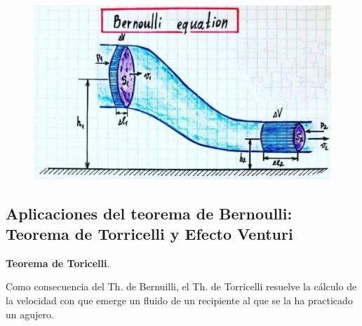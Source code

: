 \begin{figure}[H]
	\centering
	\includegraphics[width=1\textwidth]{imagenes/imagenes18/T18IM07.png}
	\end{figure}	

\subsection{Aplicaciones del teorema de Bernoulli: Teorema de Torricelli y Efecto Venturi}

\vspace{10mm} %

\textbf{\large{Teorema de Toricelli}}\normalsize{.}

\begin{miparrafodestacado}
	Como consecuencia del Th. de Bernuilli, el Th. de Torricelli resuelve la cálculo de la velocidad con que emerge un fluido de un recipiente al que se la ha practicado un agujero.
\end{miparrafodestacado}


